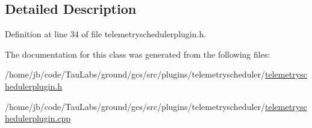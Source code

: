 \subsection{\-Detailed \-Description}


\-Definition at line 34 of file telemetryschedulerplugin.\-h.



\-The documentation for this class was generated from the following files\-:\begin{DoxyCompactItemize}
\item 
/home/jb/code/\-Tau\-Labs/ground/gcs/src/plugins/telemetryscheduler/\hyperlink{telemetryschedulerplugin_8h}{telemetryschedulerplugin.\-h}\item 
/home/jb/code/\-Tau\-Labs/ground/gcs/src/plugins/telemetryscheduler/\hyperlink{telemetryschedulerplugin_8cpp}{telemetryschedulerplugin.\-cpp}\end{DoxyCompactItemize}
